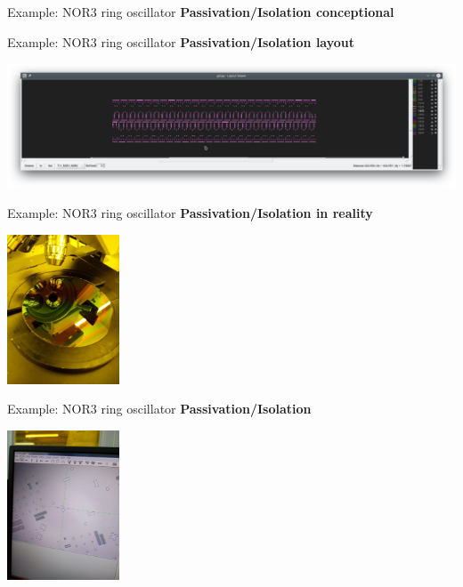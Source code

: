 \documentclass[aspectratio=169]{beamer}
\begin{document}
\begin{frame}{Example: NOR3 ring oscillator}
	\textbf{Passivation/Isolation conceptional}

	\begin{center}
		\begin{tikzpicture}[node distance = 3cm, auto, thick, scale=0.25, every node/.style={transform shape}]
			
		\end{tikzpicture}
	\end{center}
\end{frame}

\begin{frame}{Example: NOR3 ring oscillator}
	\textbf{Passivation/Isolation layout}

	\begin{center}
		\includegraphics[width=\textwidth]{images/Screenshot_20181225_081522.png}
	\end{center}
\end{frame}

\begin{frame}{Example: NOR3 ring oscillator}
	\textbf{Passivation/Isolation in reality}

	\begin{center}
		\includegraphics[width=0.25\textwidth]{images/20181220_122500_Burst01.jpg}
	\end{center}
\end{frame}

\begin{frame}{Example: NOR3 ring oscillator}
	\textbf{Passivation/Isolation}

	\begin{center}
		\includegraphics[width=0.25\textwidth]{images/20181220_124056.jpg}
	\end{center}
\end{frame}
\end{document}
